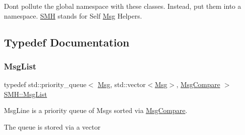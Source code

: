 Don\textquotesingle{}t pollute the global namespace with these classes. Instead, put them into a namespace. \hyperlink{namespace_s_m_h}{S\+MH} stands for Self \hyperlink{struct_s_m_h_1_1_msg}{Msg} Helpers. 

\subsection{Typedef Documentation}
\mbox{\label{namespace_s_m_h_a577a58a147f501590720badab28c2c98}} 
\subsubsection{\texorpdfstring{Msg\+List}{MsgList}}
{\footnotesize\ttfamily typedef std\+::priority\+\_\+queue$<$ \hyperlink{struct_s_m_h_1_1_msg}{Msg}, std\+::vector$<$\hyperlink{struct_s_m_h_1_1_msg}{Msg}$>$, \hyperlink{struct_s_m_h_1_1_msg_compare}{Msg\+Compare} $>$ \hyperlink{namespace_s_m_h_a577a58a147f501590720badab28c2c98}{S\+M\+H\+::\+Msg\+List}}



Msg\+Line is a priority queue of Msgs sorted via \hyperlink{struct_s_m_h_1_1_msg_compare}{Msg\+Compare}. 

The queue is stored via a vector 
